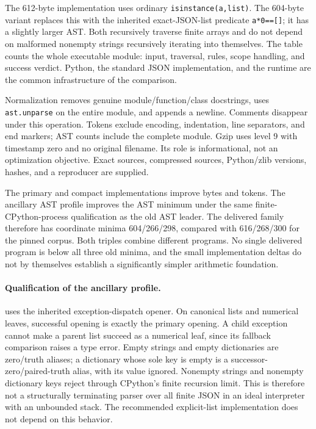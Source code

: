The 612-byte implementation uses ordinary \texttt{isinstance(a,list)}. The 604-byte variant replaces this with the inherited exact-JSON-list predicate \texttt{a*0==[]}; it has a slightly larger AST. Both recursively traverse finite arrays and do not depend on malformed nonempty strings recursively iterating into themselves. The table counts the whole executable module: input, traversal, rules, scope handling, and success verdict. Python, the standard JSON implementation, and the runtime are the common infrastructure of the comparison.

Normalization removes genuine module/function/class docstrings, uses \texttt{ast.unparse} on the entire module, and appends a newline. Comments disappear under this operation. Tokens exclude encoding, indentation, line separators, and end markers; AST counts include the complete module. Gzip uses level 9 with timestamp zero and no original filename. Its role is informational, not an optimization objective. Exact sources, compressed sources, Python/zlib versions, hashes, and a reproducer are supplied.

The primary and compact implementations improve bytes and tokens. The ancillary AST profile improves the AST minimum under the same finite-CPython-process qualification as the old AST leader. The delivered family therefore has coordinate minima 604/266/298, compared with 616/268/300 for the pinned corpus. Both triples combine different programs. No single delivered program is below all three old minima, and the small implementation deltas do not by themselves establish a significantly simpler arithmetic foundation.

\paragraph{Qualification of the ancillary profile.}
 uses the inherited exception-dispatch opener. On canonical lists and numerical leaves, successful opening is exactly the primary opening. A child exception cannot make a parent list succeed as a numerical leaf, since its fallback comparison raises a type error. Empty strings and empty dictionaries are zero/truth aliases; a dictionary whose sole key is empty is a successor-zero/paired-truth alias, with its value ignored. Nonempty strings and nonempty dictionary keys reject through CPython's finite recursion limit. This is therefore not a structurally terminating parser over all finite JSON in an ideal interpreter with an unbounded stack. The recommended explicit-list implementation does not depend on this behavior.

